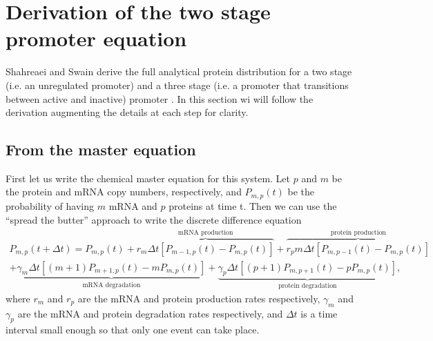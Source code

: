 \section{Derivation of the two stage promoter equation}

Shahreaei and Swain derive the full analytical protein distribution for a two
stage (i.e. an unregulated promoter) and a three stage (i.e. a promoter that
transitions between active and inactive) promoter \cite{Shahrezaei2008}. In
this section wi will follow the derivation augmenting the details at each step
for clarity.

\subsection{From the master equation}

First let us write the chemical master equation for this system. Let $p$ and $m$
be the protein and mRNA copy numbers, respectively, and $P_{m,p}(t)$ be the
probability of having $m$ mRNA and $p$ proteins at time t. Then we can use the
``spread the butter'' approach to write the discrete difference equation
\begin{equation}
\begin{aligned}
P_{m,p}(t + \Delta t) =
P_{m,p}(t) +
\overbrace{r_m \Delta t
\left[ P_{m-1,p}(t) - P_{m,p}(t) \right]}^\text{mRNA production}
+ \overbrace{r_p m \Delta t
\left[ P_{m, p-1}(t) - P_{m, p}(t) \right]}^\text{protein production}\\
+ \underbrace{\gamma_m \Delta t
\left[ (m + 1) P_{m+1,p}(t) - m P_{m, p}(t) \right]}_\text{mRNA degradation}
+ \underbrace{\gamma_p \Delta t
\left[ (p + 1) P_{m, p+1}(t) - p P_{m, p}(t) \right]}_\text{protein
degradation},
\end{aligned}
\end{equation}
where $r_m$ and $r_p$ are the mRNA and protein production rates respectively,
$\gamma_m$ and $\gamma_p$ are the mRNA and protein degradation rates
respectively, and $\Delta t$ is a time interval small enough so that only one
event can take place.

